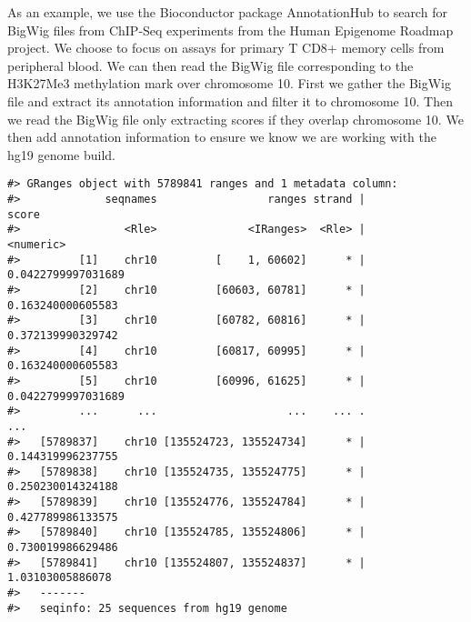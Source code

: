 \documentclass[10pt,letterpaper]{article}
\newenvironment{Shaded}{\begin{snugshade}}{\end{snugshade}}
\newcommand{\CommentTok}[1]{\textcolor[rgb]{0.56,0.35,0.01}{\textit{#1}}}
\newcommand{\DataTypeTok}[1]{\textcolor[rgb]{0.13,0.29,0.53}{#1}}
\newcommand{\KeywordTok}[1]{\textcolor[rgb]{0.13,0.29,0.53}{\textbf{#1}}}
\newcommand{\NormalTok}[1]{#1}
\newcommand{\OperatorTok}[1]{\textcolor[rgb]{0.81,0.36,0.00}{\textbf{#1}}}
\newcommand{\StringTok}[1]{\textcolor[rgb]{0.31,0.60,0.02}{#1}}
\begin{document}
As an example, we use the Bioconductor package AnnotationHub to search
for BigWig files from ChIP-Seq experiments from the Human Epigenome
Roadmap project. We choose to focus on assays for primary T CD8+ memory
cells from peripheral blood. We can then read the BigWig file
corresponding to the H3K27Me3 methylation mark over chromosome 10. First
we gather the BigWig file and extract its annotation information and
filter it to chromosome 10. Then we read the BigWig file only extracting
scores if they overlap chromosome 10. We then add annotation information
to ensure we know we are working with the hg19 genome build.

\begin{Shaded}
\end{Shaded}

\begin{verbatim}
#> GRanges object with 5789841 ranges and 1 metadata column:
#>             seqnames                 ranges strand |              score
#>                <Rle>              <IRanges>  <Rle> |          <numeric>
#>         [1]    chr10         [    1, 60602]      * | 0.0422799997031689
#>         [2]    chr10         [60603, 60781]      * |  0.163240000605583
#>         [3]    chr10         [60782, 60816]      * |  0.372139990329742
#>         [4]    chr10         [60817, 60995]      * |  0.163240000605583
#>         [5]    chr10         [60996, 61625]      * | 0.0422799997031689
#>         ...      ...                    ...    ... .                ...
#>   [5789837]    chr10 [135524723, 135524734]      * |  0.144319996237755
#>   [5789838]    chr10 [135524735, 135524775]      * |  0.250230014324188
#>   [5789839]    chr10 [135524776, 135524784]      * |  0.427789986133575
#>   [5789840]    chr10 [135524785, 135524806]      * |  0.730019986629486
#>   [5789841]    chr10 [135524807, 135524837]      * |   1.03103005886078
#>   -------
#>   seqinfo: 25 sequences from hg19 genome
\end{verbatim}
\end{document}
